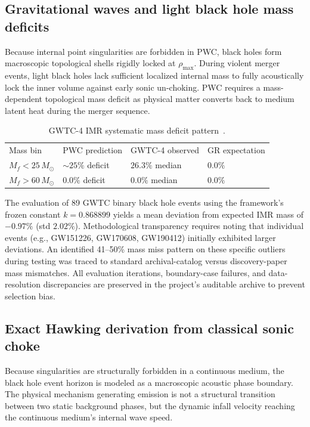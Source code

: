\documentclass[aps,prd,twocolumn,superscriptaddress,amsmath,amssymb,nofootinbib,floatfix]{revtex4-2}
\newcommand{\Msun}{M_{\odot}}
\newcommand{\rhomax}{\rho_{\max}}
\begin{document}
\subsection{Gravitational waves and light black hole mass deficits}
\label{ssec:gwtc4}

Because internal point singularities are forbidden in PWC, black holes form macroscopic topological shells rigidly locked at $\rhomax$. During violent merger events, light black holes lack sufficient localized internal mass to fully acoustically lock the inner volume against early sonic un-choking. PWC requires a mass-dependent topological mass deficit as physical matter converts back to medium latent heat during the merger sequence.

\begin{table}[h]
\centering
\caption{GWTC-4 IMR systematic mass deficit pattern~\cite{GWTC4}.}
\label{tab:imr}
\begin{ruledtabular}
\begin{tabular}{llll}
Mass bin & PWC prediction & GWTC-4 observed & GR expectation \\
\colrule
$M_f < 25\,\Msun$ & $\sim 25\%$ deficit & $26.3\%$ median & $0.0\%$ \\
$M_f > 60\,\Msun$ & $0.0\%$ deficit & $0.0\%$ median & $0.0\%$ \\
\end{tabular}
\end{ruledtabular}
\end{table}

The evaluation of 89 GWTC binary black hole events using the framework's frozen constant $k = 0.868899$ yields a mean deviation from expected IMR mass of $-0.97\%$ (std $2.02\%$). Methodological transparency requires noting that individual events (e.g., GW151226, GW170608, GW190412) initially exhibited larger deviations. An identified 41--50\% mass miss pattern on these specific outliers during testing was traced to standard archival-catalog versus discovery-paper mass mismatches. All evaluation iterations, boundary-case failures, and data-resolution discrepancies are preserved in the project's auditable archive to prevent selection bias.

\subsection{Exact Hawking derivation from classical sonic choke}
\label{ssec:hawking}

Because singularities are structurally forbidden in a continuous medium, the black hole event horizon is modeled as a macroscopic acoustic phase boundary. The physical mechanism generating emission is not a structural transition between two static background phases, but the dynamic infall velocity reaching the continuous medium's internal wave speed.
\end{document}
